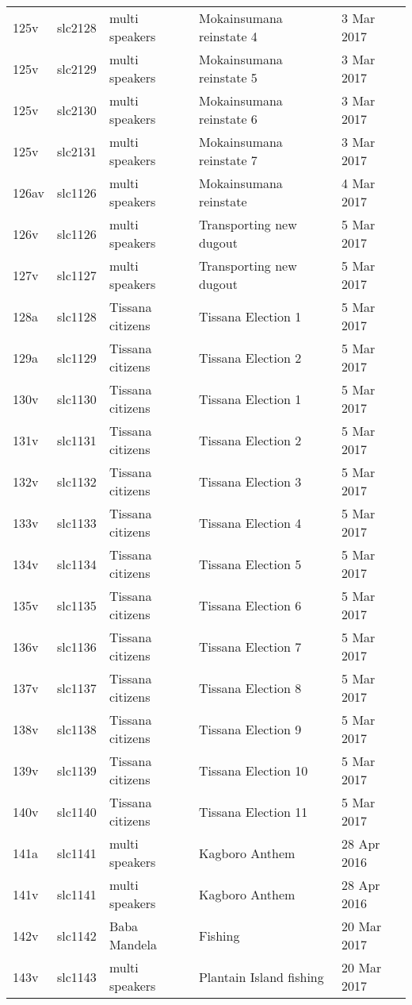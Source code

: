 \begin{xltabular}{\textwidth}{lllQl}
125v & slc2128 & multi speakers & Mokainsumana reinstate 4 & 3 Mar 2017\\
125v & slc2129 & multi speakers & Mokainsumana reinstate 5 & 3 Mar 2017\\
125v & slc2130 & multi speakers & Mokainsumana reinstate 6 & 3 Mar 2017\\
125v & slc2131 & multi speakers & Mokainsumana reinstate 7 & 3 Mar 2017\\
126av & slc1126 & multi speakers & Mokainsumana reinstate & 4 Mar 2017\\
126v & slc1126 & multi speakers & Transporting new dugout & 5 Mar 2017\\
127v & slc1127 & multi speakers & Transporting new dugout & 5 Mar 2017\\
128a & slc1128 & Tissana citizens & Tissana Election 1 & 5 Mar 2017\\
129a & slc1129 & Tissana citizens & Tissana Election 2 & 5 Mar 2017\\
130v & slc1130 & Tissana citizens & Tissana Election 1 & 5 Mar 2017\\
131v & slc1131 & Tissana citizens & Tissana Election 2 & 5 Mar 2017\\
132v & slc1132 & Tissana citizens & Tissana Election 3 & 5 Mar 2017\\
133v & slc1133 & Tissana citizens & Tissana Election 4 & 5 Mar 2017\\
134v & slc1134 & Tissana citizens & Tissana Election 5 & 5 Mar 2017\\
135v & slc1135 & Tissana citizens & Tissana Election 6 & 5 Mar 2017\\
136v & slc1136 & Tissana citizens & Tissana Election 7 & 5 Mar 2017\\
137v & slc1137 & Tissana citizens & Tissana Election 8 & 5 Mar 2017\\
138v & slc1138 & Tissana citizens & Tissana Election 9 & 5 Mar 2017\\
139v & slc1139 & Tissana citizens & Tissana Election 10 & 5 Mar 2017\\
140v & slc1140 & Tissana citizens & Tissana Election 11 & 5 Mar 2017\\
141a & slc1141 & multi speakers & Kagboro Anthem & 28 Apr 2016\\
141v & slc1141 & multi speakers & Kagboro Anthem & 28 Apr 2016\\
142v & slc1142 & Baba Mandela & Fishing & 20 Mar 2017\\
143v & slc1143 & multi speakers & Plantain Island fishing & 20 Mar 2017\\

\end{xltabular}
